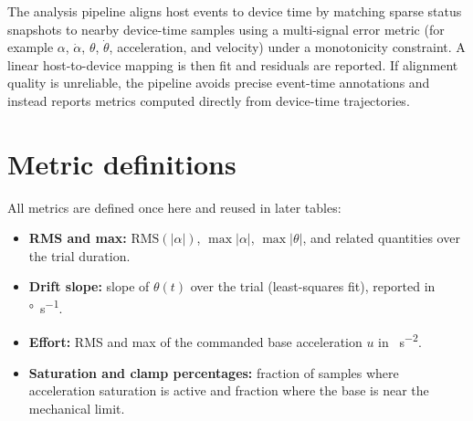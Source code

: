 The analysis pipeline aligns host events to device time by matching sparse status snapshots to nearby device-time samples using a multi-signal error metric (for example $\alpha$, $\dot{\alpha}$, $\theta$, $\dot{\theta}$, acceleration, and velocity) under a monotonicity constraint. A linear host-to-device mapping is then fit and residuals are reported. If alignment quality is unreliable, the pipeline avoids precise event-time annotations and instead reports metrics computed directly from device-time trajectories.

\section{Metric definitions}
All metrics are defined once here and reused in later tables:
\begin{itemize}
  \item \textbf{RMS and max:} $\mathrm{RMS}(|\alpha|)$, $\max|\alpha|$, $\max|\theta|$, and related quantities over the trial duration.
  \item \textbf{Drift slope:} slope of $\theta(t)$ over the trial (least-squares fit), reported in \si{\degree\per\second}.
  \item \textbf{Effort:} RMS and max of the commanded base acceleration $u$ in \si{\step\per\second\squared}.
  \item \textbf{Saturation and clamp percentages:} fraction of samples where acceleration saturation is active and fraction where the base is near the mechanical limit.
\end{itemize}

